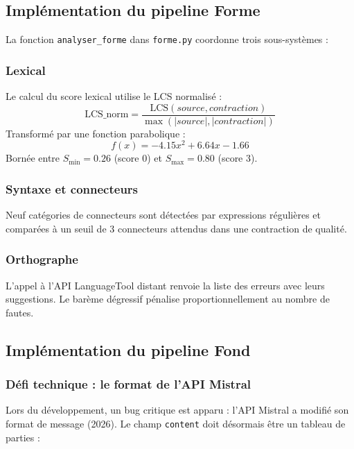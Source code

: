 \subsection{Implémentation du pipeline Forme}

La fonction \texttt{analyser\_forme} dans \texttt{forme.py} coordonne trois sous-systèmes :

\subsubsection{Lexical}

Le calcul du score lexical utilise le LCS normalisé :
\begin{equation}
\text{LCS\_norm} = \frac{\text{LCS}(source, contraction)}{\max(|source|, |contraction|)}
\end{equation}
Transformé par une fonction parabolique :
\begin{equation}
f(x) = -4.15x^2 + 6.64x - 1.66
\end{equation}
Bornée entre \(S_{\min}=0.26\) (score 0) et \(S_{\max}=0.80\) (score 3).

\subsubsection{Syntaxe et connecteurs}

Neuf catégories de connecteurs sont détectées par expressions régulières et comparées à un seuil de 3 connecteurs attendus dans une contraction de qualité.

\subsubsection{Orthographe}

L'appel à l'API LanguageTool distant renvoie la liste des erreurs avec leurs suggestions. Le barème dégressif pénalise proportionnellement au nombre de fautes.

\subsection{Implémentation du pipeline Fond}

\subsubsection{Défi technique : le format de l'API Mistral}

Lors du développement, un bug critique est apparu : l'API Mistral a modifié son format de message (2026). Le champ \texttt{content} doit désormais être un tableau de parties :

